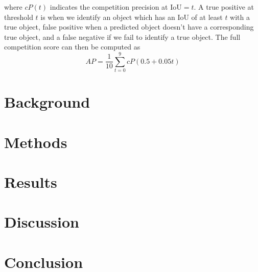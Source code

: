 \documentclass[paper=letter, fontsize=12pt]{article}
\numberwithin{equation}{section} %
\numberwithin{figure}{section} %
\numberwithin{table}{section} %
\begin{document}
where $cP(t)$ indicates the competition precision at $\text{IoU}=t$.  A true
positive at threshold $t$ is when we identify an object which has an IoU of at
least $t$ with a true object, false positive when a predicted object doesn't
have a corresponding true object, and a false negative if we fail to identify a
true object.  The full competition score can then be computed as
\begin{equation}
    AP = \frac{1}{10}\sum_{t = 0}^{9} cP(0.5 + 0.05t)
\end{equation}

\section{Background}

\section{Methods}

\section{Results}

\section{Discussion}

\section{Conclusion}
\end{document}
